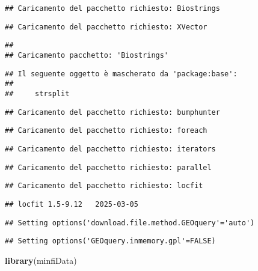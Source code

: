 \documentclass[
]{article}
\newenvironment{Shaded}{\begin{snugshade}}{\end{snugshade}}
\newcommand{\FunctionTok}[1]{\textcolor[rgb]{0.13,0.29,0.53}{\textbf{#1}}}
\newcommand{\NormalTok}[1]{#1}
\begin{document}
\begin{verbatim}
## Caricamento del pacchetto richiesto: Biostrings
\end{verbatim}

\begin{verbatim}
## Caricamento del pacchetto richiesto: XVector
\end{verbatim}

\begin{verbatim}
## 
## Caricamento pacchetto: 'Biostrings'
\end{verbatim}

\begin{verbatim}
## Il seguente oggetto è mascherato da 'package:base':
## 
##     strsplit
\end{verbatim}

\begin{verbatim}
## Caricamento del pacchetto richiesto: bumphunter
\end{verbatim}

\begin{verbatim}
## Caricamento del pacchetto richiesto: foreach
\end{verbatim}

\begin{verbatim}
## Caricamento del pacchetto richiesto: iterators
\end{verbatim}

\begin{verbatim}
## Caricamento del pacchetto richiesto: parallel
\end{verbatim}

\begin{verbatim}
## Caricamento del pacchetto richiesto: locfit
\end{verbatim}

\begin{verbatim}
## locfit 1.5-9.12   2025-03-05
\end{verbatim}

\begin{verbatim}
## Setting options('download.file.method.GEOquery'='auto')
\end{verbatim}

\begin{verbatim}
## Setting options('GEOquery.inmemory.gpl'=FALSE)
\end{verbatim}

\begin{Shaded}
\begin{Highlighting}[]
\FunctionTok{library}\NormalTok{(minfiData)}
\end{Highlighting}
\end{Shaded}
\end{document}
